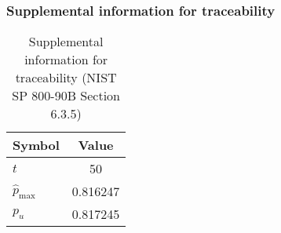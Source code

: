 \documentclass[a3paper,xelatex,english]{bxjsarticle}
\begin{document}
\subsubsection{Supplemental information for traceability}
\renewcommand{\arraystretch}{1.8}
\begin{table}[h]
\caption{Supplemental information for traceability (NIST SP 800-90B Section 6.3.5)}
\begin{center}
\begin{tabular}{|l|c|}
\hline 
\rowcolor{anotherlightblue} %
Symbol				& Value \\ \hline 
$t$				&       50\\ \hline 
$\hat{p}_{\textrm{max}}$ 			& 0.816247\\ \hline
$p_u$				& 0.817245\\ \hline
\end{tabular}
\end{center}
\end{table}
\renewcommand{\arraystretch}{1.4}
\clearpage
\end{document}
